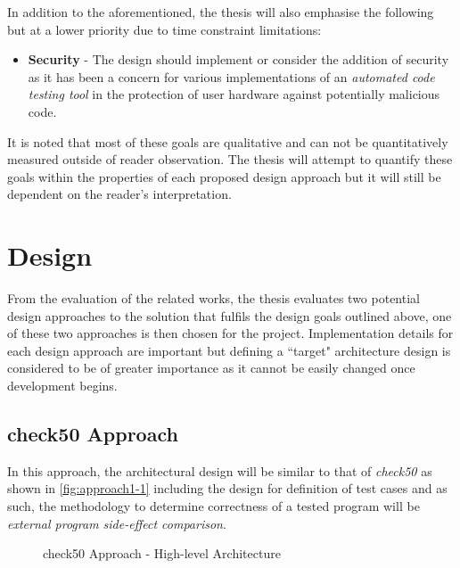 \documentclass[hidelinks]{report}
\begin{document}
In addition to the aforementioned, the thesis will also emphasise the following but at a lower priority due to time constraint limitations:

\begin{itemize}
	\item \textbf{Security} - The design should implement or consider the addition of security as it has been a concern for various implementations of an \textit{automated code testing tool} in the protection of user hardware against potentially malicious code.
\end{itemize}

It is noted that most of these goals are qualitative and can not be quantitatively measured outside of reader observation. The thesis will attempt to quantify these goals within the properties of each proposed design approach but it will still be dependent on the reader's interpretation.

\section{Design}

From the evaluation of the related works, the thesis evaluates two potential design approaches to the solution that fulfils the design goals outlined above, one of these two approaches is then chosen for the project. Implementation details for each design approach are important but defining a ``target" architecture design is considered to be of greater importance as it cannot be easily changed once development begins.

\subsection{check50 Approach}

In this approach, the architectural design will be similar to that of \textit{check50} as shown in \autoref{fig:approach1-1} including the design for definition of test cases and as such, the methodology to determine correctness of a tested program will be \textit{external program side-effect comparison}.

\begin{figure}[h]
	\centering
	\caption{check50 Approach - High-level Architecture}
	\label{fig:approach1-1}
\end{figure}
\end{document}
